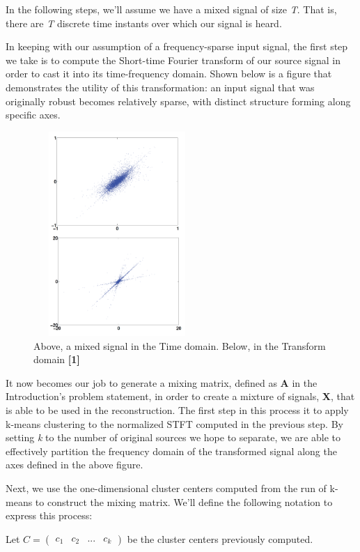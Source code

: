 \documentclass{article}
\begin{document}
In the following steps, we'll assume we have a mixed signal of size \textit{T}. That is, there are \textit{T} discrete time instants over which our signal is heard.

In keeping with our assumption of a frequency-sparse input signal, the first step we take is to compute the Short-time Fourier transform of our source signal in order to cast it into its time-frequency domain. Shown below is a figure that demonstrates the utility of this transformation: an input signal that was originally robust becomes relatively sparse, with distinct structure forming along specific axes.

\begin{figure}[h!]
	\centering
	\includegraphics[width=180pt, height=220pt]{transform_domain.png}
	\caption{Above, a mixed signal in the Time domain. Below, in the Transform domain \textbf{[1]}}
	\label{Signal in each Domain}
\end{figure}

It now becomes our job to generate a mixing matrix, defined as \textbf{A} in the Introduction's problem statement, in order to create a mixture of signals, \textbf{X}, that is able to be used in the reconstruction. The first step in this process it to apply k-means clustering to the normalized STFT computed in the previous step. By setting \textit{k} to the number of original sources we hope to separate, we are able to effectively partition the frequency domain of the transformed signal along the axes defined in the above figure.

Next, we use the one-dimensional cluster centers computed from the run of k-means to construct the mixing matrix. We'll define the following notation to express this process:

Let $C = \left( \begin{smallmatrix} c_{1}&c_{2}&...&c_{\textit{k}} \end{smallmatrix} \right)$ be the cluster centers previously computed. 
\end{document}
